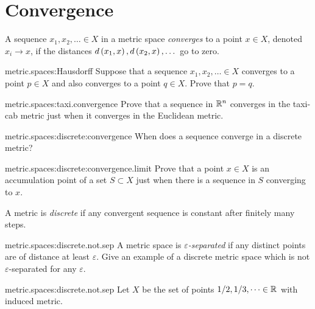 \section{Convergence}
A sequence \(x_1, x_2, \dots \in X\) in a metric space \emph{converges} to a point \(x \in X\), denoted \(x_i \to x\), if the distances \(d\left(x_1,x\right), d\left(x_2, x\right), \dots\) go to zero.
\begin{problem}{metric.spaces:Hausdorff}
Suppose that a sequence \(x_1, x_2, \dots \in X\) converges to a point \(p \in X\) and also converges to a point \(q \in X\).
Prove that \(p=q\).
\end{problem}
\begin{problem}{metric.spaces:taxi.convergence}
Prove that a sequence in \(\mathbb{R}^{n}\) converges in the taxi-cab metric just when it converges in the Euclidean metric.
\end{problem}
\begin{problem}{metric.spaces:discrete:convergence}
When does a sequence converge in a discrete metric?
\end{problem}
\begin{problem}{metric.spaces:discrete:convergence.limit}
Prove that a point \(x \in X\) is an accumulation point of a set \(S \subset X\) just when there is a sequence in \(S\) converging to \(x\).
\end{problem}
A metric is \emph{discrete} if any convergent sequence is constant after finitely many steps.
\begin{problem}{metric.spaces:discrete.not.sep}
A metric space is \emph{\(\varepsilon\)-separated} if any distinct points are of distance at least \(\varepsilon\).
Give an example of a discrete metric space which is not \(\varepsilon\)-separated for any \(\varepsilon\).
\end{problem}
\begin{answer}{metric.spaces:discrete.not.sep}
Let \(X\) be the set of points \(1/2, 1/3, \dots \in \mathbb{R}^{}\) with induced metric.
\end{answer}


